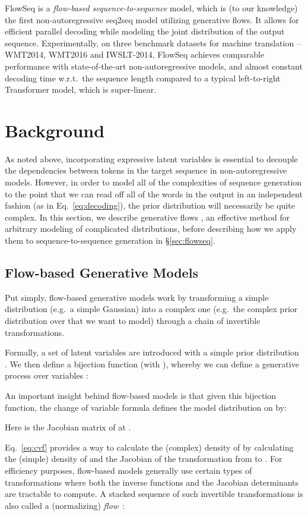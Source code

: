 \documentclass[11pt,a4paper]{article}
\begin{document}
FlowSeq is a \emph{flow-based sequence-to-sequence} model, which is (to our knowledge) the first non-autoregressive seq2seq model utilizing generative flows.
It allows for efficient parallel decoding while modeling the joint distribution of the output sequence.
Experimentally, on three benchmark datasets for machine translation -- WMT2014, WMT2016 and IWSLT-2014, 
FlowSeq achieves comparable performance with state-of-the-art non-autoregressive models, and almost constant decoding time w.r.t.~the sequence length compared to a typical left-to-right Transformer model, which is super-linear.

\section{Background}
As noted above, incorporating expressive latent variables  is essential to decouple the dependencies between tokens in the target sequence in non-autoregressive models.
However, in order to model all of the complexities of sequence generation to the point that we can read off all of the words in the output in an independent fashion (as in Eq.~\eqref{eq:decoding}), the prior distribution  will necessarily be quite complex.
In this section, we describe generative flows \cite{rezende2015variational}, an effective method for arbitrary modeling of complicated distributions, before describing how we apply them to sequence-to-sequence generation in \S\ref{sec:flowseq}.

\subsection{Flow-based Generative Models}
\label{subsec:flow}
Put simply, flow-based generative models work by transforming a simple distribution (e.g.~a simple Gaussian) into a complex one (e.g.~the complex prior distribution over  that we want to model) through a chain of invertible transformations.

Formally, a set of latent variables  are introduced with a simple prior distribution .
We then define a bijection function  (with ), whereby we can define a generative process over variables :

An important insight behind flow-based models is that given this bijection function, the change of variable formula defines the model distribution on  by:

Here  is the Jacobian matrix of  at .

Eq.~\eqref{eq:cvf} provides a way to calculate the (complex) density of  by calculating the (simple) density of  and the Jacobian of the transformation from  to .
For efficiency purposes, flow-based models generally use certain types of transformations  where both the inverse functions  and the Jacobian determinants are tractable to compute.
A stacked sequence of such invertible transformations is also called a (normalizing) \emph{flow}~\citep{rezende2015variational}:
\end{document}
